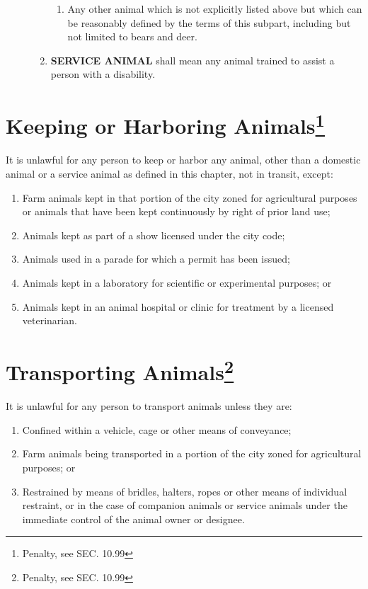 \begin{description}
\begin{enumerate}[{\indent}1)]
\begin{enumerate}
            \item Any other animal which is not explicitly listed above but which can be reasonably defined by the terms of this subpart, including but not limited to bears and deer.
        \end{enumerate}
        \item \textbf{SERVICE ANIMAL} shall mean any animal trained to assist a person with a disability.
    \end{enumerate}
\end{description}

\section{Keeping or Harboring Animals\footnote{Penalty, see SEC. 10.99}}
It is unlawful for any person to keep or harbor any animal, other than a domestic animal or a service animal as defined in this chapter, not in transit, except:
\begin{enumerate}[{\indent}A)]
    \item Farm animals kept in that portion of the city zoned for agricultural purposes or animals that have been kept continuously by right of prior land use;
    \item Animals kept as part of a show licensed under the city code;
    \item Animals used in a parade for which a permit has been issued;
    \item Animals kept in a laboratory for scientific or experimental purposes; or
    \item Animals kept in an animal hospital or clinic for treatment by a licensed veterinarian.
\end{enumerate}

\section{Transporting Animals\footnote{Penalty, see SEC. 10.99}}
It is unlawful for any person to transport animals unless they are:
\begin{enumerate}[{\indent}A)]
    \item Confined within a vehicle, cage or other means of conveyance;
    \item Farm animals being transported in a portion of the city zoned for agricultural purposes; or
    \item Restrained by means of bridles, halters, ropes or other means of individual restraint, or in the case of companion animals or service animals under the immediate control of the animal owner or designee.
\end{enumerate}


